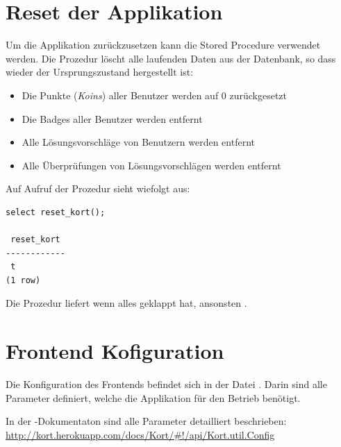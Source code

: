 \section{Reset der Applikation}
\label{kort-reset}
Um die Applikation zurückzusetzen kann die Stored Procedure  verwendet werden. 
Die Prozedur löscht alle laufenden Daten aus der Datenbank, so dass wieder der Ursprungszustand hergestellt ist:
\begin{itemize}
\item Die Punkte (\emph{Koins}) aller Benutzer werden auf 0 zurückgesetzt
\item Die Badges aller Benutzer werden entfernt
\item Alle Lösungsvorschläge von Benutzern werden entfernt
\item Alle Überprüfungen von Lösungsvorschlägen werden entfernt
\end{itemize}

Auf Aufruf der Prozedur sieht wiefolgt aus:
\begin{lstlisting}[float, caption=Aufruf von reset\_kort() um die Applikation zurückzusetzen, label=kort-reset-cmd]
select reset_kort();

 reset_kort 
------------
 t
(1 row)
\end{lstlisting}

Die Prozedur liefert  wenn alles geklappt hat, ansonsten .

\section{Frontend Kofiguration}
\label{frontend-config}
Die Konfiguration des Frontends befindet sich in der Datei .
Darin sind alle Parameter definiert, welche die Applikation für den Betrieb benötigt.

In der \kort{}-Dokumentaton sind alle Parameter detailliert beschrieben: \url{http://kort.herokuapp.com/docs/Kort/#!/api/Kort.util.Config}
